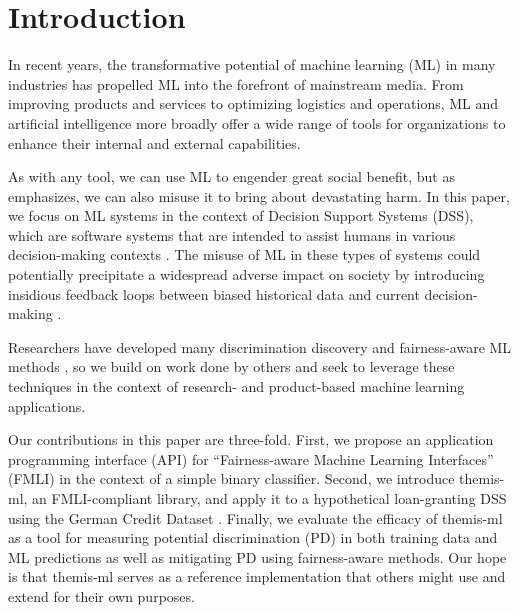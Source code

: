 \documentclass{acm_proc_article-sp}
\begin{document}




\section{Introduction} In recent years, the transformative potential of machine
learning (ML) in many industries has propelled ML into the forefront of
mainstream media. From improving products and services to optimizing logistics
and operations, ML and artificial intelligence more broadly offer a wide range
of tools for organizations to enhance their internal and external capabilities.

As with any tool, we can use ML to engender great social benefit, but as
\cite{o2017weapons} emphasizes, we can also misuse it to bring about devastating
harm. In this paper, we focus on ML systems in the context of Decision Support
Systems (DSS), which are software systems that are intended to assist humans in
various decision-making contexts \cite{yoshimura2006decision,
montgomery2000evaluation, barnett1987dxplain, mysiak2005towards}. The misuse of
ML in these types of systems could potentially precipitate a widespread adverse
impact on society by introducing insidious feedback loops between biased
historical data and current decision-making \cite{o2017weapons}.

Researchers have developed many discrimination discovery and fairness-aware ML
methods \cite{kusner2017counterfactual, kamiran2012data, kamishima2012fairness,
kamiran2012decision, zemel2013learning, zafar2017fairness, dwork2012fairness,
zliobaite2015survey}, so we build on work done by others and seek to leverage
these techniques in the context of research- and product-based machine learning
applications.

Our contributions in this paper are three-fold. First, we propose an application
programming interface (API) for ``Fairness-aware Machine Learning Interfaces''
(FMLI) in the context of a simple binary classifier. Second, we introduce
themis-ml, an FMLI-compliant library, and apply it to a hypothetical
loan-granting DSS using the German Credit Dataset \cite{bache2013uci}. Finally, we
evaluate the efficacy of themis-ml as a tool for measuring potential
discrimination (PD) in both training data and ML predictions as well as
mitigating PD using fairness-aware methods. Our hope is that themis-ml serves as
a reference implementation that others might use and extend for their own
purposes.
\end{document}
